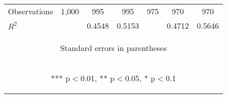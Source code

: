 \begin{center}
\begin{tabular}{lcccccc}
Observations & 1,000 & 995 & 995 & 975 & 970 & 970 \\
 $R^2$ &  & 0.4548 & 0.5153 &  & 0.4712 & 0.5646 \\ \hline
\multicolumn{7}{c}{\begin{footnotesize} Standard errors in parentheses\end{footnotesize}} \\
\multicolumn{7}{c}{\begin{footnotesize} *** p$<$0.01, ** p$<$0.05, * p$<$0.1\end{footnotesize}} \\
\end{tabular}
\end{center}
